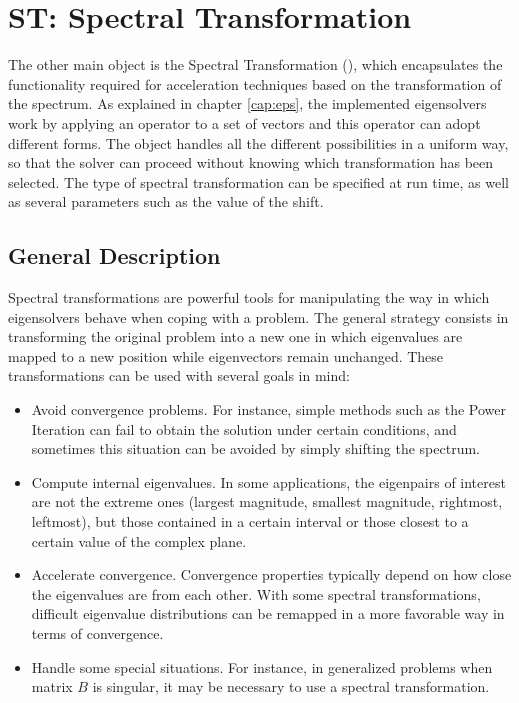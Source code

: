 \chapter{\label{cap:st}ST: Spectral Transformation}

\noindent The other main \slepc object is the Spectral Transformation (), which encapsulates the functionality required for acceleration techniques based on the transformation of the spectrum. As explained in chapter \ref{cap:eps}, the implemented eigensolvers work by applying an operator to a set of vectors and this operator can adopt different forms. The  object handles all the different possibilities in a uniform way, so that the solver can proceed without knowing which transformation has been selected. The type of spectral transformation can be specified at run time, as well as several parameters such as the value of the shift.
	
\section{General Description}

	Spectral transformations are powerful tools for manipulating the way in which eigensolvers behave when coping with a problem. The general strategy consists in transforming the original problem into a new one in which eigenvalues are mapped to a new position while eigenvectors remain unchanged. These transformations can be used with several goals in mind:
\begin{itemize}
\item Avoid convergence problems. For instance, simple methods such as the Power Iteration can fail to obtain the solution under certain conditions, and sometimes this situation  can be avoided by simply shifting the spectrum.
\item Compute internal eigenvalues. In some applications, the eigenpairs of interest are not the extreme ones (largest magnitude, smallest magnitude, rightmost, leftmost), but those contained in a certain interval or those closest to a certain value of the complex plane.
\item Accelerate convergence. Convergence properties typically depend on how close the eigenvalues are from each other. With some spectral transformations, difficult eigenvalue distributions can be remapped in a more favorable way in terms of convergence. 
\item Handle some special situations. For instance, in generalized problems when matrix $B$ is singular, it may be necessary to use a spectral transformation.
\end{itemize}
	
